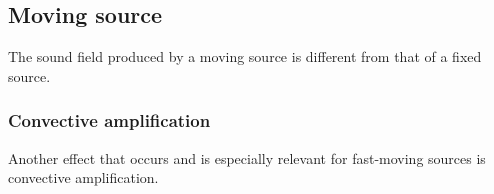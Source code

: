 \subsection{Moving source}
The sound field produced by a moving source is different from that of a fixed source.

\subsubsection{Convective amplification}
Another effect that occurs and is especially relevant for fast-moving sources is
convective amplification.

\cite{Dowling1976}


